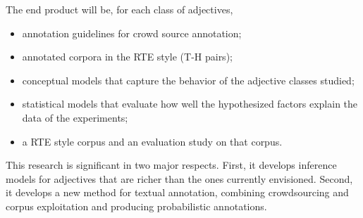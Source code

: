 \documentclass[10pt]{article}
\newcommand{\moveup}{\vspace*{-1.8mm}}
\begin{document}
The end product will be, for each class of adjectives,
\begin{itemize}
\moveup
\item annotation guidelines for crowd source annotation;
\moveup
\item annotated corpora in the RTE style (T-H pairs);
\moveup
\item conceptual models that capture the behavior of the adjective classes studied;
\moveup
\item statistical models that evaluate how well the hypothesized factors explain the data of the experiments;
\moveup
\moveup
\moveup
\item a RTE style corpus and an evaluation study on that corpus.
\moveup
\end{itemize} 

This research is significant in two major respects. First, it develops inference models for adjectives that are richer than the ones currently envisioned. Second, it develops a new method for textual annotation, combining crowdsourcing and corpus exploitation and producing probabilistic annotations.

\end{document}
